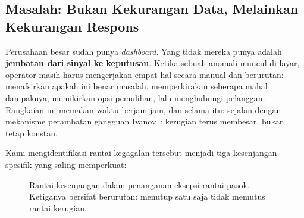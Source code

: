 \documentclass[12pt,a4paper]{article}
\begin{document}
\subsection{Masalah: Bukan Kekurangan Data, Melainkan Kekurangan Respons}

Perusahaan besar sudah punya \textit{dashboard}. Yang tidak mereka punya adalah \textbf{jembatan dari sinyal ke keputusan}. Ketika sebuah anomali muncul di layar, operator masih harus mengerjakan empat hal secara manual dan berurutan: menafsirkan apakah ini benar masalah, memperkirakan seberapa mahal dampaknya, memikirkan opsi pemulihan, lalu menghubungi pelanggan. Rangkaian ini memakan waktu berjam-jam, dan selama itu: sejalan dengan mekanisme perambatan gangguan Ivanov~\cite{ivanov}: kerugian terus membesar, bukan tetap konstan.

Kami mengidentifikasi rantai kegagalan tersebut menjadi tiga kesenjangan spesifik yang saling memperkuat:

\begin{figure}[H]
  \centering
  \caption{Rantai kesenjangan dalam penanganan eksepsi rantai pasok. Ketiganya bersifat berurutan: menutup satu saja tidak memutus rantai kerugian.}
  \label{fig:gap}
\end{figure}
\end{document}
